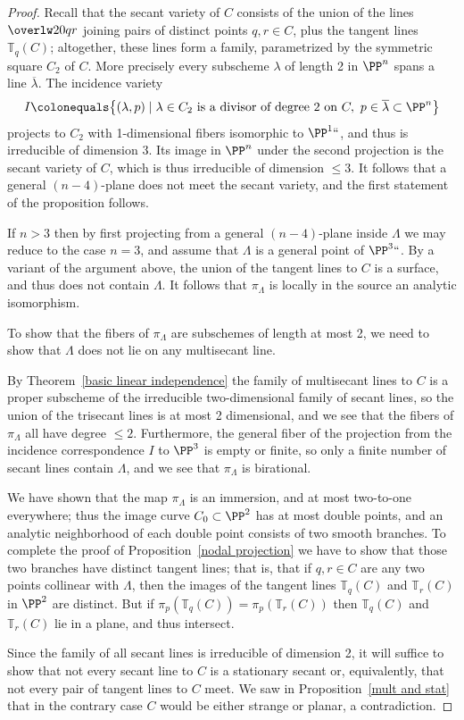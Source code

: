 \begin{proof} Recall that the
secant variety
%
of $C$ consists of the
union of the lines $\overlw20{qr}$ joining pairs of distinct points
$q,r \in C$, plus the tangent lines ${\mathbb T}_q(C)$; altogether,
these lines form a family, parametrized by the symmetric square $C_2$
of $C$. More precisely every subscheme $\lambda$ of
length 2 in $\PP^n$ spans a line $\overline \lambda$. The incidence
variety
$$
I\colonequals \bigl\{(\lambda, p)\mid \lambda\in C_2 \hbox{ is a divisor of
degree 2 on }C,\ p\in \overline \lambda\subset\PP^n\bigr\}
$$
projects to $C_2$ with 1-dimensional fibers isomorphic to $\PP^1` `$,
and thus
is irreducible of dimension 3. Its image in $\PP^n$ under the second
projection
is the secant variety of $C$, which is thus irreducible of dimension
$\leq 3$.
It follows that a general
$(n-4)$-plane does not meet the secant variety, and the first statement
of the proposition follows.

If $n>3$ then by first projecting from a general $(n-4)$-plane inside
$\Lambda$ we may reduce to the case $n=3$, and assume that $\Lambda$ is a
general point of $\PP^3` `$. By a variant of the argument above, the union
of the tangent lines to $C$ is a surface, and thus does not contain
$\Lambda$.
It follows that $\pi_\Lambda$ is locally in the source an analytic
isomorphism.

To show that the fibers of $\pi_\Lambda$ are subschemes of length at
most 2,
we need to show that $\Lambda$ does not lie on any
%
multisecant line.

By Theorem~\ref{basic linear independence} the family of multisecant
lines to $C$ is a proper subscheme of the irreducible two-dimensional
family of secant lines, so the union of the trisecant lines is at most 2
dimensional, and we see that the fibers of $\pi_\Lambda$ all have degree
$\leq 2$. Furthermore, the general fiber of the projection
from the incidence correspondence $I$ to $\PP^3$ is empty or finite,
so only a finite number of secant lines contain $\Lambda$, and we see
that $\pi_\Lambda$ is birational.

We have shown that the map $\pi_\Lambda$ is an immersion, and at
most two-to-one everywhere; thus the image curve $C_0 \subset \PP^2$
has at most double points, and an analytic neighborhood of each
double point  consists of two smooth branches. To complete the proof
of Proposition~\ref{nodal projection} we have to show that those two
branches have distinct tangent lines; that is, that
if $q, r \in C$ are any two points collinear with $\Lambda$, then the
images of the tangent lines ${\mathbb T}_q(C)$ and ${\mathbb T}_r(C)$ in
$\PP^2$ are distinct. But if  $\pi_p({\mathbb T}_q(C)) = \pi_p({\mathbb
T}_r(C))$ then  ${\mathbb T}_q(C)$ and ${\mathbb T}_r(C)$ lie in a plane,
and thus intersect.

Since the family of all secant lines is irreducible of dimension 2,  it
will suffice to show that not every secant line to $C$ is a
stationary secant
%
or, equivalently, that not every pair of tangent lines to $C$
meet. We saw in Proposition~\ref{mult and stat} that in the contrary
case
$C$ would be either strange or planar, a contradiction.
\end{proof}


